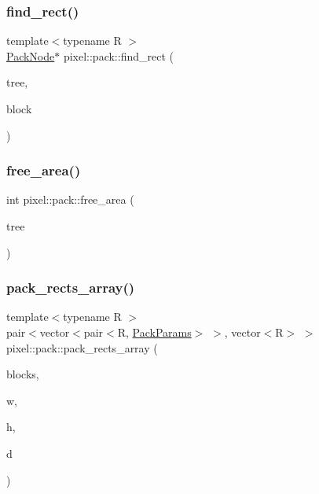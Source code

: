\subsubsection{\texorpdfstring{find\+\_\+rect()}{find\_rect()}}
{\footnotesize\ttfamily template$<$typename R $>$ \\
\hyperlink{structpixel_1_1pack_1_1_pack_node}{Pack\+Node}$\ast$ pixel\+::pack\+::find\+\_\+rect (\begin{DoxyParamCaption}\item[{\hyperlink{structpixel_1_1pack_1_1_pack_node}{Pack\+Node} $\ast$}]{tree,  }\item[{const R \&}]{block }\end{DoxyParamCaption})}

\mbox{\label{namespacepixel_1_1pack_a11d5f6090d9349fa694e3feed87b9172}} 
\subsubsection{\texorpdfstring{free\+\_\+area()}{free\_area()}}
{\footnotesize\ttfamily int pixel\+::pack\+::free\+\_\+area (\begin{DoxyParamCaption}\item[{const \hyperlink{structpixel_1_1pack_1_1_pack_node}{Pack\+Node} $\ast$}]{tree }\end{DoxyParamCaption})}

\mbox{\label{namespacepixel_1_1pack_ad9875063c72901283bcd63efa4d34594}} 
\subsubsection{\texorpdfstring{pack\+\_\+rects\+\_\+array()}{pack\_rects\_array()}}
{\footnotesize\ttfamily template$<$typename R $>$ \\
pair$<$vector$<$pair$<$R, \hyperlink{structpixel_1_1pack_1_1_pack_params}{Pack\+Params}$>$ $>$, vector$<$R$>$ $>$ pixel\+::pack\+::pack\+\_\+rects\+\_\+array (\begin{DoxyParamCaption}\item[{vector$<$ R $>$ \&}]{blocks,  }\item[{unsigned}]{w,  }\item[{unsigned}]{h,  }\item[{unsigned}]{d }\end{DoxyParamCaption})}

